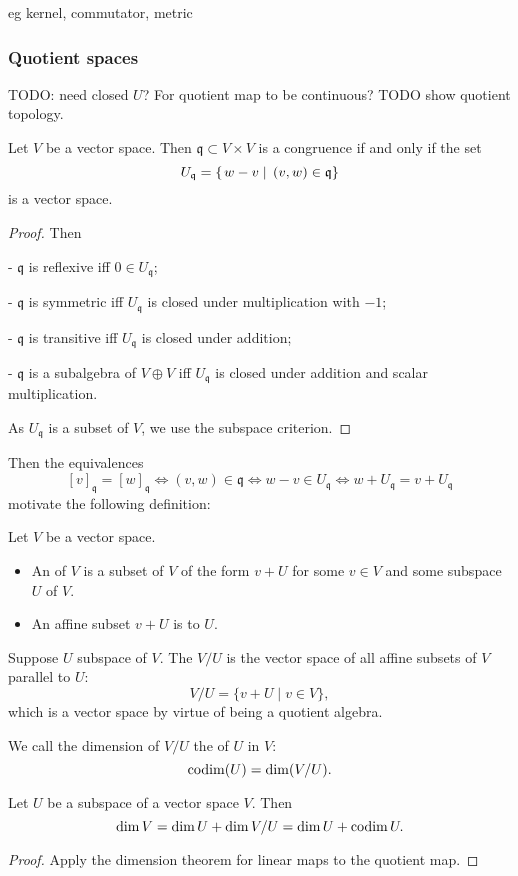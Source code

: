 eg kernel, commutator, metric

\subsubsection{Quotient spaces}
TODO: need closed $U$? For quotient map to be continuous? TODO show quotient topology.

\begin{proposition}
Let $V$ be a vector space. Then $\mathfrak{q}\subset V\times V$ is a congruence \textup{if and only if} the set
\[ U_\mathfrak{q} = \left\{\left. w-v \;\right|\; (v,w)\in\mathfrak{q} \right\} \]
is a vector space.
\end{proposition}
\begin{proof} Then

- $\mathfrak{q}$ is reflexive iff $0\in U_\mathfrak{q}$;

- $\mathfrak{q}$ is symmetric iff $U_\mathfrak{q}$ is closed under multiplication with $-1$;

- $\mathfrak{q}$ is transitive iff $U_\mathfrak{q}$ is closed under addition;

- $\mathfrak{q}$ is a subalgebra of $V\oplus V$ iff $U_\mathfrak{q}$ is closed under addition and scalar multiplication.

As $U_\mathfrak{q}$ is a subset of $V$, we use the subspace criterion.
\end{proof}
Then the equivalences
\[ [v]_\mathfrak{q}=[w]_\mathfrak{q} \iff (v,w)\in\mathfrak{q} \iff w-v\in U_\mathfrak{q} \iff w+U_\mathfrak{q} = v+U_\mathfrak{q} \]
motivate the following definition:
\begin{definition}
Let $V$ be a vector space.
\begin{itemize}
\item An  of $V$ is a subset of $V$ of the form $v+U$ for some $v\in V$ and some subspace $U$ of $V$.
\item An affine subset $v+U$ is  to $U$.
\end{itemize}
Suppose $U$ subspace of $V$. The  $V/U$ is the vector space of all affine subsets of $V$ parallel to $U$:
\[ V/U = \{ v+U \;|\; v\in V \}, \]
which is a vector space by virtue of being a quotient algebra.

We call the dimension of $V/U$ the  of $U$ in $V$:
\[ \operatorname{codim}(U) = \dim(V/U). \]
\end{definition}

\begin{proposition}
Let $U$ be a subspace of a vector space $V$. Then
\[ \dim V = \dim U + \dim V/U = \dim U + \operatorname{codim} U.  \]
\end{proposition}
\begin{proof}
Apply the dimension theorem for linear maps to the quotient map.
\end{proof}

